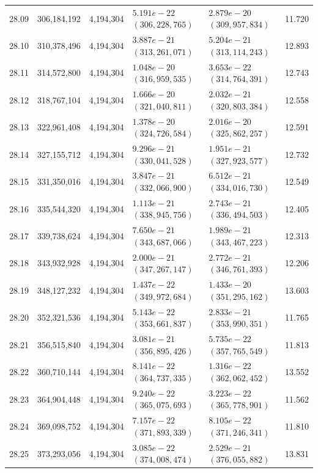 \documentclass[11pt]{article}
\theoremstyle{definition}
\begin{document}
\begin{longtable}{@{}c r r >{\raggedleft\arraybackslash}p{34mm} >{\raggedleft\arraybackslash}p{34mm} r@{}}
28.09 & 306{,}184{,}192 & 4{,}194{,}304 & $5.191e-22$ $(306{,}228{,}765)$ & $2.879e-20$ $(309{,}957{,}834)$ & 11.720 \\
28.10 & 310{,}378{,}496 & 4{,}194{,}304 & $3.887e-21$ $(313{,}261{,}071)$ & $5.204e-21$ $(313{,}114{,}243)$ & 12.893 \\
28.11 & 314{,}572{,}800 & 4{,}194{,}304 & $1.048e-20$ $(316{,}959{,}535)$ & $3.653e-22$ $(314{,}764{,}391)$ & 12.743 \\
28.12 & 318{,}767{,}104 & 4{,}194{,}304 & $1.666e-20$ $(321{,}040{,}811)$ & $2.032e-21$ $(320{,}803{,}384)$ & 12.558 \\
28.13 & 322{,}961{,}408 & 4{,}194{,}304 & $1.378e-20$ $(324{,}726{,}584)$ & $2.016e-20$ $(325{,}862{,}257)$ & 12.591 \\
28.14 & 327{,}155{,}712 & 4{,}194{,}304 & $9.296e-21$ $(330{,}041{,}528)$ & $1.951e-21$ $(327{,}923{,}577)$ & 12.732 \\
28.15 & 331{,}350{,}016 & 4{,}194{,}304 & $3.847e-21$ $(332{,}066{,}900)$ & $6.512e-21$ $(334{,}016{,}730)$ & 12.549 \\
28.16 & 335{,}544{,}320 & 4{,}194{,}304 & $1.113e-21$ $(338{,}945{,}756)$ & $2.743e-21$ $(336{,}494{,}503)$ & 12.405 \\
28.17 & 339{,}738{,}624 & 4{,}194{,}304 & $7.650e-21$ $(343{,}687{,}066)$ & $1.989e-21$ $(343{,}467{,}223)$ & 12.313 \\
28.18 & 343{,}932{,}928 & 4{,}194{,}304 & $2.000e-21$ $(347{,}267{,}147)$ & $2.772e-21$ $(346{,}761{,}393)$ & 12.206 \\
28.19 & 348{,}127{,}232 & 4{,}194{,}304 & $1.437e-22$ $(349{,}972{,}684)$ & $1.433e-20$ $(351{,}295{,}162)$ & 13.603 \\
28.20 & 352{,}321{,}536 & 4{,}194{,}304 & $5.143e-22$ $(353{,}661{,}837)$ & $2.833e-21$ $(353{,}990{,}351)$ & 11.765 \\
28.21 & 356{,}515{,}840 & 4{,}194{,}304 & $3.081e-21$ $(356{,}895{,}426)$ & $5.735e-22$ $(357{,}765{,}549)$ & 11.813 \\
28.22 & 360{,}710{,}144 & 4{,}194{,}304 & $8.141e-22$ $(364{,}737{,}335)$ & $1.316e-22$ $(362{,}062{,}452)$ & 13.552 \\
28.23 & 364{,}904{,}448 & 4{,}194{,}304 & $9.240e-22$ $(365{,}075{,}693)$ & $3.223e-22$ $(365{,}778{,}901)$ & 11.562 \\
28.24 & 369{,}098{,}752 & 4{,}194{,}304 & $7.157e-22$ $(371{,}893{,}339)$ & $8.105e-22$ $(371{,}246{,}341)$ & 11.810 \\
28.25 & 373{,}293{,}056 & 4{,}194{,}304 & $3.085e-22$ $(374{,}008{,}474)$ & $2.529e-21$ $(376{,}055{,}882)$ & 13.831 \\

\end{longtable}
\end{document}
